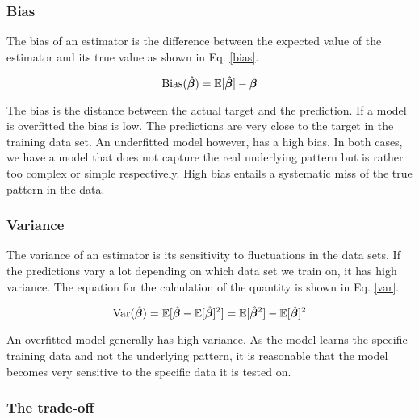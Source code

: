 
\subsubsection{Bias}
The bias of an estimator is the difference between the expected value of the estimator and its true value as shown in Eq. \ref{bias}. 

\begin{equation}\label{bias}
    \text{Bias}(\hat{\boldsymbol{\beta}}) = \mathbb{E}[\hat{\boldsymbol{\beta}}]-\boldsymbol{\beta}
\end{equation}

The bias is the distance between the actual target and the prediction. If a model is overfitted the bias is low. The predictions are very close to the target in the training data set. An underfitted model however, has a high bias. In both cases, we have a model that does not capture the real underlying pattern but is rather too complex or simple respectively. High bias entails a systematic miss of the true pattern in the data. %

\subsubsection{Variance}

The variance of an estimator is its sensitivity to fluctuations in the data sets. If the predictions vary a lot depending on which data set we train on, it has high variance. The equation for the calculation of the quantity is shown in Eq. \ref{var}. 

\begin{equation}\label{var}
    \text{Var}(\hat{\boldsymbol{\beta}}) = \mathbb{E}[\hat{\boldsymbol{\beta}}-\mathbb{E}[\hat{\boldsymbol{\beta}}]^2] = \mathbb{E}[\hat{\boldsymbol{\beta}}^2] - \mathbb{E}[\hat{\boldsymbol{\beta}}]^2
\end{equation}

An overfitted model generally has high variance. As the model learns the specific training data and not the underlying pattern, it is reasonable that the model becomes very sensitive to the specific data it is tested on.

\subsubsection{The trade-off}


